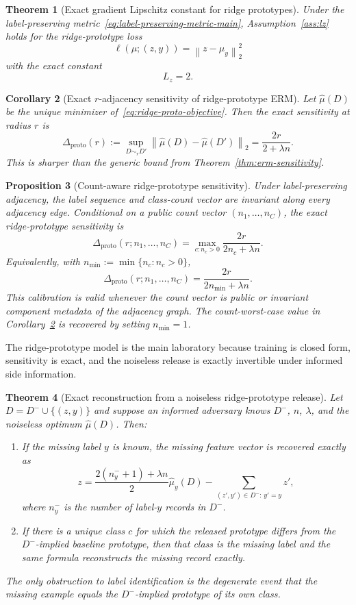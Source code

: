 \documentclass[11pt,a4paper]{report}
\theoremstyle{plain}
\newtheorem{theorem}{Theorem}[chapter]
\newtheorem{proposition}[theorem]{Proposition}
\newtheorem{corollary}[theorem]{Corollary}
\theoremstyle{definition}
\theoremstyle{remark}
\newcommand{\norm}[1]{\left\lVert #1\right\rVert}
\begin{document}
\begin{theorem}[Exact gradient Lipschitz constant for ridge prototypes]
\label{thm:proto-lz}
Under the label-preserving metric~\eqref{eq:label-preserving-metric-main}, Assumption~\ref{ass:lz} holds for the ridge-prototype loss
\[
\ell(\mu;(z,y))=\norm{z-\mu_y}_2^2
\]
with the exact constant
\[
L_z=2.
\]
\end{theorem}

\begin{corollary}[Exact $r$-adjacency sensitivity of ridge-prototype ERM]
\label{cor:proto-sensitivity}
Let $\widehat\mu(D)$ be the unique minimizer of~\eqref{eq:ridge-proto-objective}.  Then the exact sensitivity at radius $r$ is
\[
\Delta_{\mathrm{proto}}(r)
:=
\sup_{D\sim_rD'}\norm{\widehat\mu(D)-\widehat\mu(D')}_2
=
\frac{2r}{2+\lambda n}.
\]
This is sharper than the generic bound from Theorem~\ref{thm:erm-sensitivity}.
\end{corollary}

\begin{proposition}[Count-aware ridge-prototype sensitivity]
\label{prop:proto-count-aware-sensitivity}
Under label-preserving adjacency, the label sequence and class-count vector are invariant along every adjacency edge.  Conditional on a public count vector $(n_1,\ldots,n_C)$, the exact ridge-prototype sensitivity is
\[
\Delta_{\mathrm{proto}}(r;n_1,\ldots,n_C)
=
\max_{c:n_c>0}\frac{2r}{2n_c+\lambda n}.
\]
Equivalently, with $n_{\min}:=\min\{n_c:n_c>0\}$,
\[
\Delta_{\mathrm{proto}}(r;n_1,\ldots,n_C)
=
\frac{2r}{2n_{\min}+\lambda n}.
\]
This calibration is valid whenever the count vector is public or invariant component metadata of the adjacency graph.  The count-worst-case value in Corollary~\ref{cor:proto-sensitivity} is recovered by setting $n_{\min}=1$.
\end{proposition}

The ridge-prototype model is the main laboratory because training is closed form, sensitivity is exact, and the noiseless release is exactly invertible under informed side information.

\begin{theorem}[Exact reconstruction from a noiseless ridge-prototype release]
\label{thm:proto-exact-recon}
Let $D=D^-\cup\{(z,y)\}$ and suppose an informed adversary knows $D^-$, $n$, $\lambda$, and the noiseless optimum $\widehat\mu(D)$.  Then:
\begin{enumerate}[leftmargin=1.5em]
    \item If the missing label $y$ is known, the missing feature vector is recovered exactly as
    \[
    z=
    \frac{2(n_y^-+1)+\lambda n}{2}\widehat\mu_y(D)
    -
    \sum_{(z',y')\in D^-:\,y'=y}z',
    \]
    where $n_y^-$ is the number of label-$y$ records in $D^-$.
    \item If there is a unique class $c$ for which the released prototype differs from the $D^-$-implied baseline prototype, then that class is the missing label and the same formula reconstructs the missing record exactly.
\end{enumerate}
The only obstruction to label identification is the degenerate event that the missing example equals the $D^-$-implied prototype of its own class.
\end{theorem}
\end{document}
